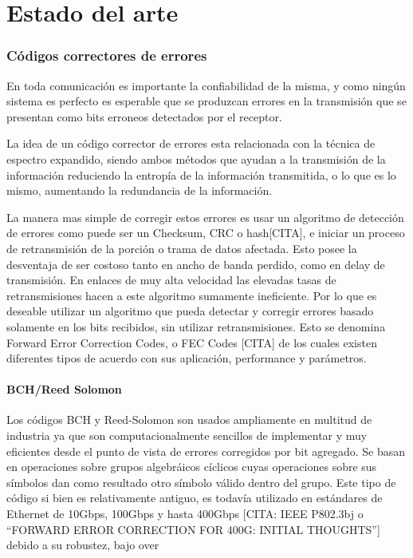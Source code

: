 \chapter{Estado del arte}

\subsection{Códigos correctores de errores}
En toda comunicación es importante la confiabilidad de la misma, y como ningún sistema es perfecto es esperable que se produzcan errores en la transmisión que se presentan como bits erroneos detectados por el receptor. 

La idea de un código corrector de errores esta relacionada con la técnica de espectro expandido, siendo ambos métodos que ayudan a la transmisión de la información reduciendo la entropía de la información transmitida, o lo que es lo mismo, aumentando la redundancia de la información. 

La manera mas simple de corregir estos errores es usar un algoritmo de detección de errores como puede ser un Checksum, CRC o hash[CITA], e iniciar un proceso de retransmisión de la porción o trama de datos afectada. Esto posee la desventaja de ser costoso tanto en ancho de banda perdido, como en delay de transmisión. En enlaces de muy alta velocidad las elevadas tasas de retransmisiones hacen a este algoritmo sumamente ineficiente. 
Por lo que es deseable utilizar un algoritmo que pueda detectar y corregir errores basado solamente en los bits recibidos, sin utilizar retransmisiones. Esto se denomina Forward Error Correction Codes, o FEC Codes [CITA] de los cuales existen diferentes tipos de acuerdo con sus aplicación, performance y parámetros.

\subsubsection{BCH/Reed Solomon}
Los códigos BCH y Reed-Solomon son usados ampliamente en multitud de industria ya que son computacionalmente sencillos de implementar y muy eficientes desde el punto de vista de errores corregidos por bit agregado. Se basan en operaciones sobre grupos algebráicos cíclicos cuyas operaciones sobre sus símbolos dan como resultado otro símbolo válido dentro del grupo. 
Este tipo de código si bien es relativamente antiguo, es todavía utilizado en estándares de Ethernet de 10Gbps, 100Gbps y hasta 400Gbps [CITA: IEEE P802.3bj  o ``FORWARD ERROR CORRECTION FOR 400G: INITIAL THOUGHTS''] debido a su robustez, bajo over

